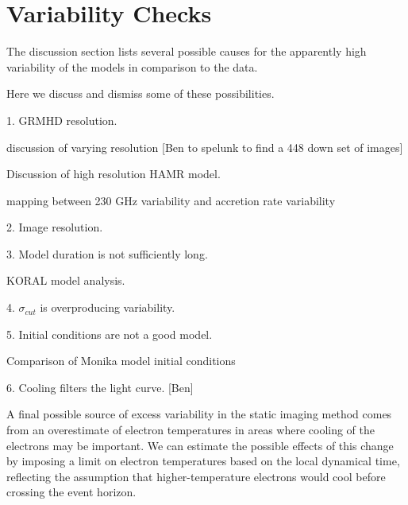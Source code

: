 \section{Variability Checks}\label{app:variability}


The discussion section lists several possible causes for the apparently high variability of the models in comparison to the data.

Here we discuss and dismiss some of these possibilities.

1. GRMHD resolution.

discussion of varying resolution [Ben to spelunk to find a 448 down set of images]

Discussion of high resolution HAMR model.

mapping between 230 GHz variability and accretion rate variability

2. Image resolution.

3. Model duration is not sufficiently long.

KORAL model analysis.

4. $\sigma_{cut}$ is overproducing variability.

5. Initial conditions are not a good model.

Comparison of Monika model initial conditions

6. Cooling filters the light curve. [Ben]

A final possible source of excess variability in the static imaging method comes from an overestimate of electron temperatures in areas where cooling of the electrons may be important.  We can estimate the possible effects of this change by imposing a limit on electron temperatures based on the local dynamical time, reflecting the assumption that higher-temperature electrons would cool before crossing the event horizon.

